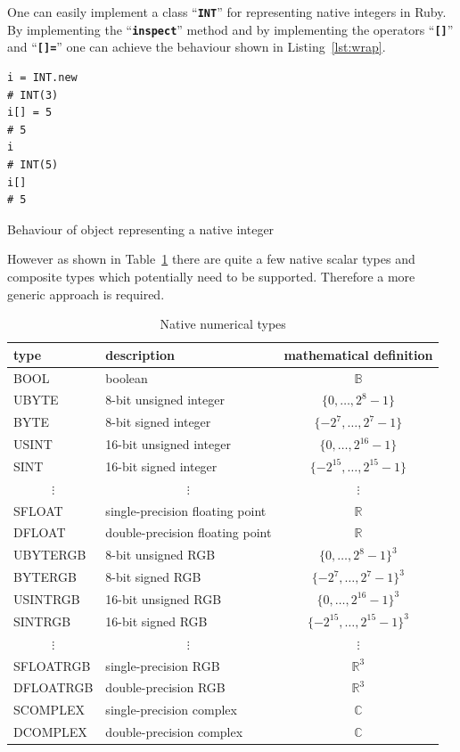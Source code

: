 \documentclass[10pt,journal,compsoc]{joser1}
\newcommand{\code}[1]{``\texttt{\textbf{\textcolor{codegray}{\small{#1}}}}''}
\newcommand{\tbl}[1]{Table~\ref{tbl:#1}}
\newcommand{\lst}[1]{Listing~\ref{lst:#1}}
\begin{document}
One can easily implement a class \code{INT} for representing native integers in
Ruby. By implementing the \code{inspect} method and by implementing the
operators \code{[]} and \code{[]=} one can achieve the behaviour shown in
\lst{wrap}.
\begin{listing}[htbp]
  \begin{verbatim}
i = INT.new
# INT(3)
i[] = 5
# 5
i
# INT(5)
i[]
# 5
  \end{verbatim}
  \caption{Behaviour of object representing a native integer\label{lst:wrap}}
\end{listing}
However as shown in \tbl{scalars} there are quite a few native scalar types and
composite types which potentially need to be supported. Therefore a more
generic approach is required.
\begin{table}[htbp]
  \begin{center}
    \caption{Native numerical types\label{tbl:scalars}}
    \begin{tabular}{llc}\toprule
    \textbf{type} &
    \textbf{description} &
    \parbox[t]{.2\columnwidth}{\textbf{mathematical definition}}\\\midrule
    BOOL     & boolean                 & $\mathbb{B}$\\
    UBYTE    & 8-bit unsigned integer  & $\{0,\ldots,2^8-1\}$\\
    BYTE     & 8-bit signed integer    & $\{-2^7,\ldots,2^7-1\}$\\
    USINT    & 16-bit unsigned integer & $\{0,\ldots,2^{16}-1\}$\\
    SINT     & 16-bit signed integer   & $\{-2^{15},\ldots,2^{15}-1\}$\\
     &  & $\vdots$\\
    SFLOAT    & single-precision floating point & $\mathbb{R}$\\
    DFLOAT    & double-precision floating point & $\mathbb{R}$\\
    UBYTERGB & 8-bit unsigned RGB      & $\{0,\ldots,2^8-1\}^3$\\
    BYTERGB  & 8-bit signed RGB        & $\{-2^7,\ldots,2^7-1\}^3$\\
    USINTRGB & 16-bit unsigned RGB     & $\{0,\ldots,2^{16}-1\}^3$\\
    SINTRGB  & 16-bit signed RGB       & $\{-2^{15},\ldots,2^{15}-1\}^3$\\
     &  & $\vdots$\\
    SFLOATRGB & single-precision RGB   & $\mathbb{R}^3$\\
    DFLOATRGB & double-precision RGB   & $\mathbb{R}^3$\\
    SCOMPLEX  & single-precision complex & $\mathbb{C}$\\
    DCOMPLEX  & double-precision complex & $\mathbb{C}$\\\bottomrule
    \end{tabular}
  \end{center}
\end{table}
\end{document}
